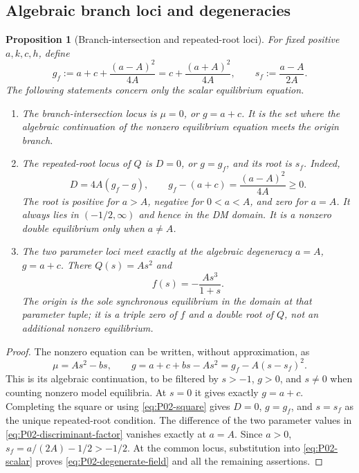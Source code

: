 \documentclass[11pt]{article}
\newtheorem{proposition}[theorem]{Proposition}
\theoremstyle{definition}
\theoremstyle{remark}
\begin{document}
\subsection{Algebraic branch loci and degeneracies}

\begin{proposition}[Branch-intersection and repeated-root loci]
\label{prop:P02-loci}
For fixed positive $a,k,c,h$, define
\begin{equation}
\label{eq:P02-gf}
 g_f:=a+c+\frac{(a-A)^2}{4A}
      =c+\frac{(a+A)^2}{4A},\qquad
 s_f:=\frac{a-A}{2A}.
\end{equation}
The following statements concern only the scalar equilibrium equation.
\begin{enumerate}[label=(\roman*),leftmargin=*]
\item The \emph{branch-intersection locus} is $\mu=0$, or $g=a+c$.
It is the set where the algebraic continuation of the nonzero
equilibrium equation meets the origin branch.
\item The \emph{repeated-root locus} of $Q$ is $D=0$, or $g=g_f$,
and its root is $s_f$. Indeed,
\begin{equation}
\label{eq:P02-discriminant-factor}
 D=4A(g_f-g),\qquad
 g_f-(a+c)=\frac{(a-A)^2}{4A}\ge0.
\end{equation}
The root is positive for $a>A$, negative for $0<a<A$, and zero
for $a=A$. It always lies in $(-1/2,\infty)$ and hence in the
DM domain. It is a nonzero double equilibrium only when $a\ne A$.
\item The two parameter loci meet exactly at the \emph{algebraic
degeneracy} $a=A$, $g=a+c$. There $Q(s)=As^2$ and
\begin{equation}
\label{eq:P02-degenerate-field}
 f(s)=-\frac{As^3}{1+s}.
\end{equation}
The origin is the sole synchronous equilibrium in the domain at
that parameter tuple; it is a triple zero of $f$ and a double root
of $Q$, not an additional nonzero equilibrium.
\end{enumerate}
\end{proposition}

\begin{proof}
The nonzero equation can be written, without approximation, as
\begin{equation}
\label{eq:P02-branch-graph}
 \mu=As^2-bs,\qquad
 g=a+c+bs-As^2
   =g_f-A(s-s_f)^2.
\end{equation}
This is its algebraic continuation, to be filtered by $s>-1$,
$g>0$, and $s\ne0$ when counting nonzero model equilibria.
At $s=0$ it gives exactly $g=a+c$. Completing the square or using
\eqref{eq:P02-square} gives $D=0$, $g=g_f$, and $s=s_f$ as the
unique repeated-root condition. The difference of the two parameter
values in \eqref{eq:P02-discriminant-factor} vanishes exactly at
$a=A$. Since $a>0$, $s_f=a/(2A)-1/2>-1/2$. At the common
locus, substitution into \eqref{eq:P02-scalar} proves
\eqref{eq:P02-degenerate-field} and all the remaining assertions.
\end{proof}
\end{document}
